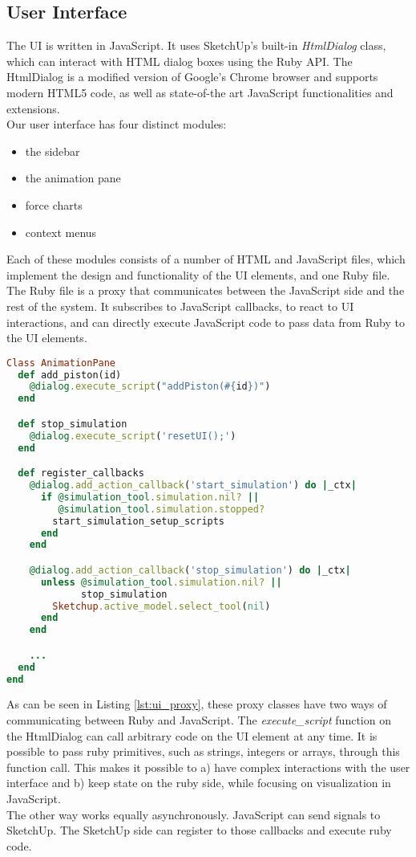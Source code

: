 \subsection{User Interface}
The \ac{UI} is written in JavaScript. It uses SketchUp's built-in \textit{HtmlDialog} class, which can interact with HTML dialog boxes using the Ruby \ac{API}. The HtmlDialog is a modified version of Google's Chrome browser and supports modern HTML5 code, as well as state-of-the art JavaScript functionalities and extensions.\\
Our user interface has four distinct modules:
\begin{itemize}
    \item the sidebar
    \item the animation pane
    \item force charts
    \item context menus
\end{itemize}

Each of these modules consists of a number of HTML and JavaScript files, which implement the design and functionality of the UI elements, and one Ruby file. The Ruby file is a proxy that communicates between the JavaScript side and the rest of the system. It subscribes to JavaScript callbacks, to react to UI interactions, and can directly execute JavaScript code to pass data from Ruby to the UI elements.
\begin{lstlisting}[language=Ruby, label={lst:ui_proxy}, caption=excerpt from UI callbacks]
Class AnimationPane
  def add_piston(id)
    @dialog.execute_script("addPiston(#{id})")
  end

  def stop_simulation
    @dialog.execute_script('resetUI();')
  end

  def register_callbacks
    @dialog.add_action_callback('start_simulation') do |_ctx|
      if @simulation_tool.simulation.nil? ||
         @simulation_tool.simulation.stopped?
        start_simulation_setup_scripts
      end
    end

    @dialog.add_action_callback('stop_simulation') do |_ctx|
      unless @simulation_tool.simulation.nil? ||
             stop_simulation
        Sketchup.active_model.select_tool(nil)
      end
    end

    ...
  end
end
\end{lstlisting}
As can be seen in Listing \ref{lst:ui_proxy}, these proxy classes have two ways of communicating between Ruby and JavaScript. The \textit{execute\_script} function on the HtmlDialog can call arbitrary code on the UI element at any time. It is possible to pass ruby primitives, such as strings, integers or arrays, through this function call. This makes it possible to a) have complex interactions with the user interface and b) keep state on the ruby side, while focusing on visualization in JavaScript.\\
The other way works equally asynchronously. JavaScript can send signals to SketchUp. The SketchUp side can register to those callbacks and execute ruby code.

